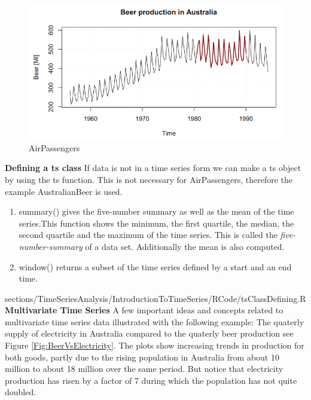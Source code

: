 {{\begin{figure}[H]
\begin{minipage}[c]{0.5\textwidth}
		\caption{AirPassengers}
	\end{minipage}\hfill
	\begin{minipage}[c]{0.5\textwidth}
	\includegraphics[width=1\linewidth]{images/tsSeasBehav.png}
	\end{minipage}\hfill
\end{figure}
\RTheory
{
\textbf{Defining a {\color{blue}ts} class}\vfill
If data is not in a time series form we can make a {\color{blue}ts} object by using the {\color{blue}ts}  function. This is not necessary for AirPassengers, therefore the example AustralianBeer is used.
\begin{enumerate}
	\item  {\color{blue}summary()} gives the five-number summary as well as the mean of the time series.This function shows the minimum, the first quartile, the median, the second quartile and the maximum of the time series. This is called the \textit{five-number-summary} of a data set. Additionally the mean is also computed.
	\item  {\color{blue}window()} returns a subset of the time series defined by a start and an end time.
\end{enumerate}
}
{sections/TimeSeriesAnalysis/IntroductionToTimeSeries/RCode/tsClassDefining.R}
\RTheory
{
\textbf{Multivariate Time Series}\vfill
A few important ideas and concepts related to multivariate time series data illustrated with the following example:\vfill
\hfill
\break
The quaterly supply of electricity in Australia compared to the quaterly beer production see Figure \ref{Fig:BeerVsElectricity}.\vfill
The plots show increasing trends in production for both goods, partly
due to the rising population in Australia from about 10 million to about 18 million over the same period. But notice that electricity production has risen by a factor of 7 during which the population has not quite doubled. \vfill
}}}
